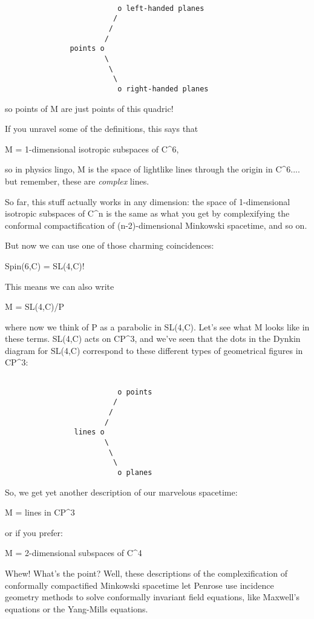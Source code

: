 \begin{verbatim}

                          o left-handed planes
                         /
                        /
                       /
               points o 
                       \
                        \
                         \
                          o right-handed planes
\end{verbatim}
    
so points of M are just points of this quadric!

If you unravel some of the definitions, this says that

M = {1-dimensional isotropic subspaces of C^{6}},

so in physics lingo, M is the space of lightlike lines through the
origin in C^{6}.... but remember, these are \emph{complex} lines.

So far, this stuff actually works in any dimension: the space of 
1-dimensional isotropic subspaces of C^{n} is the same
as what you get by complexifying the conformal compactification of 
(n-2)-dimensional Minkowski spacetime, and so on.

But now we can use one of those charming coincidences:

Spin(6,C) = SL(4,C)!

This means we can also write

M = SL(4,C)/P

where now we think of P as a parabolic in SL(4,C).  Let's see
what M looks like in these terms.  SL(4,C) acts on CP^{3}, and
we've seen that the dots in the Dynkin diagram for SL(4,C) 
correspond to these different types of geometrical figures in CP^{3}:


\begin{verbatim}

                          o points
                         /
                        /
                       /
                lines o 
                       \
                        \
                         \
                          o planes

\end{verbatim}
    
So, we get yet another description of our marvelous spacetime:

M = {lines in CP^{3}}

or if you prefer:

M = {2-dimensional subspaces of C^{4}}

Whew!  What's the point?  Well, these descriptions of the
complexification of conformally compactified Minkowski spacetime let
Penrose use incidence geometry methods to solve conformally invariant
field equations, like Maxwell's equations or the Yang-Mills equations.

